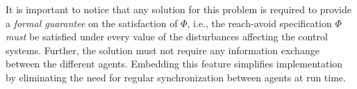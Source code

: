 \begin{comment}
\begin{description}
	\item[Inputs:] Control systems $\Sigma^i=(X^i,x_\init^i,U^i,W^i,f^i)$, $i\in [1;N]$, and the global specification $\Phi=\lnot\avoid\,\mathcal{U}\,\goal$.%
	\item[Parameters:] A robustness margin $\varepsilon\in \reals^n_{>0}$.%
	\item[Output:] Local feedback controllers $\set{C^i}$ for $\set{\Sigma^i}$, $i\in [1;N]$, such that $\set{C^i}\parallel \set{\Sigma^i}$ realizes $\Phi$. 
\end{description}
\end{comment}

It is important to notice that any solution for this problem is required to provide a \emph{formal guarantee} on the satisfaction of $\Phi$, 
i.e., the reach-avoid specification $\Phi$ \emph{must} be satisfied under every value of the disturbances affecting the control systems. 
Further, the solution must not require any information exchange between the different agents. Embedding this feature simplifies implementation by eliminating the need for regular synchronization between agents at run time.

